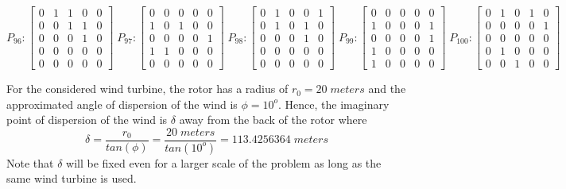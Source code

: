     $$
        P_{96} : \begin{bmatrix}
            0 & 1 & 1 & 0 & 0 \\
            0 & 0 & 1 & 1 & 0 \\
            0 & 0 & 0 & 1 & 0 \\
            0 & 0 & 0 & 0 & 0 \\
            0 & 0 & 0 & 0 & 0
        \end{bmatrix}
        \;
         P_{97} : \begin{bmatrix}
            0 & 0 & 0 & 0 & 0 \\
            1 & 0 & 1 & 0 & 0 \\
            0 & 0 & 0 & 0 & 1 \\
            1 & 1 & 0 & 0 & 0 \\
            0 & 0 & 0 & 0 & 0
        \end{bmatrix}
        \;
        P_{98} : \begin{bmatrix}
            0 & 1 & 0 & 0 & 1 \\
            0 & 1 & 0 & 1 & 0 \\
            0 & 0 & 0 & 1 & 0 \\
            0 & 0 & 0 & 0 & 0 \\
            0 & 0 & 0 & 0 & 0
        \end{bmatrix}
        \;  
        P_{99} : \begin{bmatrix}
            0 & 0 & 0 & 0 & 0 \\
            1 & 0 & 0 & 0 & 1 \\
            0 & 0 & 0 & 0 & 1 \\
            1 & 0 & 0 & 0 & 0 \\
            1 & 0 & 0 & 0 & 0
        \end{bmatrix}
        \;  
        P_{100} : \begin{bmatrix}
            0 & 1 & 0 & 1 & 0 \\
            0 & 0 & 0 & 0 & 1 \\
            0 & 0 & 0 & 0 & 0 \\
            0 & 1 & 0 & 0 & 0 \\
            0 & 0 & 1 & 0 & 0
        \end{bmatrix}
    $$  
    \fontsize{12}{12}\selectfont
    \doublespacing

    For the considered wind turbine, the rotor has a radius of $r_0=20\;meters$ and the approximated angle of dispersion of the wind is $\phi=10^o$. Hence, the imaginary point of dispersion of the wind is $\delta$ away from the back of the rotor where
    \begin{equation}
        \delta = \frac{r_0}{tan(\phi)} = \frac{20\;meters}{tan(10^o)} = 113.4256364\;meters
    \end{equation}
    Note that $\delta$ will be fixed even for a larger scale of the problem as long as the same wind turbine is used.
    
